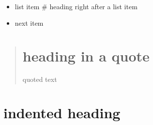\begin{itemize}
\item list item \# heading right after a list item
\item next item 
\end{itemize}

\begin{quotation}
\chapter{heading in a quote}

  quoted text
\end{quotation}
\chapter{indented heading}

